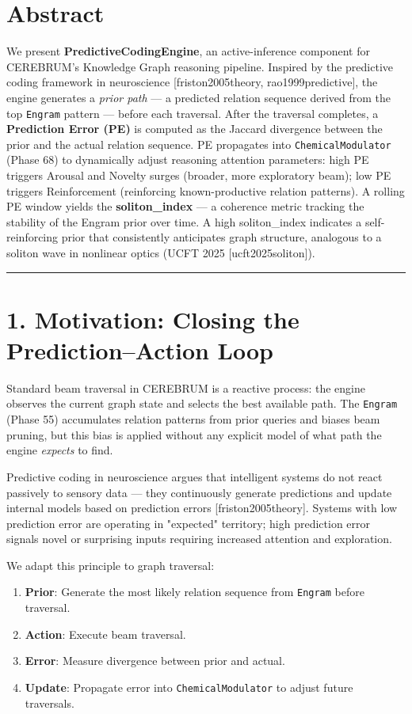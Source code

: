 
\section*{Abstract}

We present \textbf{PredictiveCodingEngine}, an active-inference component for CEREBRUM's Knowledge Graph reasoning pipeline. Inspired by the predictive coding framework in neuroscience [friston2005theory, rao1999predictive], the engine generates a \textit{prior path} --- a predicted relation sequence derived from the top \texttt{Engram} pattern --- before each traversal. After the traversal completes, a \textbf{Prediction Error (PE)} is computed as the Jaccard divergence between the prior and the actual relation sequence. PE propagates into \texttt{ChemicalModulator} (Phase 68) to dynamically adjust reasoning attention parameters: high PE triggers Arousal and Novelty surges (broader, more exploratory beam); low PE triggers Reinforcement (reinforcing known-productive relation patterns). A rolling PE window yields the \textbf{soliton_index} --- a coherence metric tracking the stability of the Engram prior over time. A high soliton_index indicates a self-reinforcing prior that consistently anticipates graph structure, analogous to a soliton wave in nonlinear optics (UCFT 2025 [ucft2025soliton]).

\medskip\noindent\rule{\linewidth}{0.4pt}\medskip

\section*{1. Motivation: Closing the Prediction--Action Loop}

Standard beam traversal in CEREBRUM is a reactive process: the engine observes the current graph state and selects the best available path. The \texttt{Engram} (Phase 55) accumulates relation patterns from prior queries and biases beam pruning, but this bias is applied without any explicit model of what path the engine \textit{expects} to find.

Predictive coding in neuroscience argues that intelligent systems do not react passively to sensory data --- they continuously generate predictions and update internal models based on prediction errors [friston2005theory]. Systems with low prediction error are operating in "expected" territory; high prediction error signals novel or surprising inputs requiring increased attention and exploration.

We adapt this principle to graph traversal:
\begin{enumerate}
  \item \textbf{Prior}: Generate the most likely relation sequence from \texttt{Engram} before traversal.
  \item \textbf{Action}: Execute beam traversal.
  \item \textbf{Error}: Measure divergence between prior and actual.
  \item \textbf{Update}: Propagate error into \texttt{ChemicalModulator} to adjust future traversals.
\end{enumerate}


